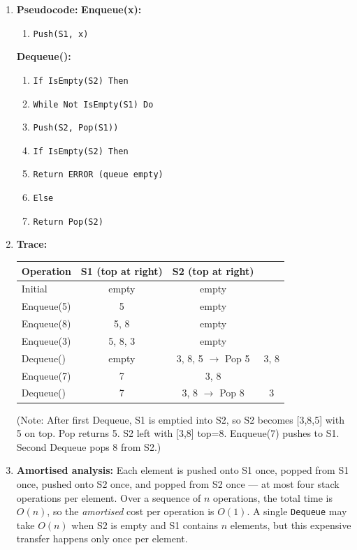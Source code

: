 \documentclass[11pt]{article}
\begin{document}
\begin{corrige}
\begin{enumerate}
\item \textbf{Pseudocode:}
\textbf{Enqueue(x):}
\begin{enumerate}
\item \texttt{Push(S1, x)}
\end{enumerate}

\textbf{Dequeue():}
\begin{enumerate}
\item \texttt{If IsEmpty(S2) Then}
\item \quad \texttt{While Not IsEmpty(S1) Do}
\item \quad \quad \texttt{Push(S2, Pop(S1))}
\item \texttt{If IsEmpty(S2) Then}
\item \quad \texttt{Return ERROR (queue empty)}
\item \texttt{Else}
\item \quad \texttt{Return Pop(S2)}
\end{enumerate}

\item \textbf{Trace:}
\begin{center}
\begin{tabular}{|l|c|cc|}\hline
\rowcolor{popblueL}
\textbf{Operation} & \textbf{S1 (top at right)} & \textbf{S2 (top at right)} \\ \hline
Initial & empty & empty \\ \hline
Enqueue(5) & 5 & empty \\ \hline
Enqueue(8) & 5, 8 & empty \\ \hline
Enqueue(3) & 5, 8, 3 & empty \\ \hline
Dequeue() & empty & 3, 8, 5 $\rightarrow$ Pop 5 & 3, 8 \\ \hline
Enqueue(7) & 7 & 3, 8 \\ \hline
Dequeue() & 7 & 3, 8 $\rightarrow$ Pop 8 & 3 \\ \hline
\end{tabular}
\end{center}
(Note: After first Dequeue, S1 is emptied into S2, so S2 becomes [3,8,5] with 5 on top. Pop returns 5. S2 left with [3,8] top=8. Enqueue(7) pushes to S1. Second Dequeue pops 8 from S2.)

\item \textbf{Amortised analysis:} Each element is pushed onto S1 once, popped from S1 once, pushed onto S2 once, and popped from S2 once — at most four stack operations per element. Over a sequence of $n$ operations, the total time is $O(n)$, so the \emph{amortised} cost per operation is $O(1)$. A single \texttt{Dequeue} may take $O(n)$ when S2 is empty and S1 contains $n$ elements, but this expensive transfer happens only once per element.
\end{enumerate}
\end{corrige}
\end{document}
